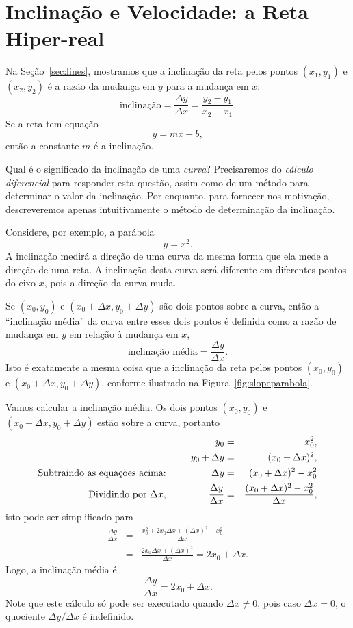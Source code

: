 \section{Inclinação e Velocidade: a Reta Hiper-real}
\label{sec:hyperrealline}

Na Seção~\ref{sec:lines}, mostramos que a inclinação da reta pelos pontos
$(x_1, y_1)$ e $(x_2, y_2)$ é a razão da mudança em $y$ para a
mudança em $x$:
\[
  \text{inclinação} = \frac{\Delta y}{\Delta x} = \frac{y_2 - y_1}{x_2 - x_1}.
\]
Se a reta tem equação
\[
  y = mx+b,
\]
então a constante $m$ é a inclinação.

Qual é o significado da inclinação de uma \emph{curva}? Precisaremos
do \emph{cálculo diferencial} para responder esta questão, assim como
de um método para determinar o valor da inclinação.
Por enquanto, para fornecer-nos motivação, descreveremos apenas
intuitivamente o método de determinação da inclinação.

Considere, por exemplo, a parábola
\[
  y = x^2.
\]
A inclinação medirá a direção de uma curva da mesma forma que ela
mede a direção de uma reta. A inclinação desta curva será diferente
em diferentes pontos do eixo $x$, pois a direção da curva muda.

Se $(x_0, y_0)$ e $(x_0 + \Delta x, y_0 + \Delta y)$ são dois pontos
sobre a curva, então a ``inclinação média'' da curva entre esses
dois pontos é definida como a razão de mudança em $y$ em relação
à mudança em $x$,
\[
  \text{inclinação média} = \frac{\Delta y}{\Delta x}.
\]
Isto é exatamente a mesma coisa que a inclinação da reta pelos pontos
$(x_0, y_0)$ e $(x_0 + \Delta x, y_0 + \Delta y)$, conforme
ilustrado na Figura~\ref{fig:slopeparabola}.


Vamos calcular a inclinação média. Os dois pontos $(x_0, y_0)$ e
$(x_0 + \Delta x, y_0 + \Delta y)$ estão sobre a curva, portanto
\begin{eqnarray*}
                         y_0 & = & x_0^2, \\
              y_0 + \Delta y & = & (x_0 + \Delta x)^2, \\
\text{Subtraindo as equações acima: } \hspace{10ex}
                    \Delta y & = & (x_0 + \Delta x)^2 - x_0^2 \\
\text{Dividindo por } \Delta x, \hspace{10ex}
   \frac{\Delta y}{\Delta x} & = & \frac{(x_0 + \Delta x)^2 - x_0^2}%
                                        {\Delta x},
\end{eqnarray*}
isto pode ser simplificado para
\begin{eqnarray*}
  \frac{\Delta y}{\Delta x}  & = & 
             \frac{x_0^2 + 2 x_0 \Delta x + (\Delta x)^2 - x_0^2}%
                  {\Delta x} \\
                             & = &
             \frac{2 x_0 \Delta x + (\Delta x)^2}%
                  {\Delta x} = 2x_0 + \Delta x.
\end{eqnarray*}
Logo, a inclinação média é
\[
  \frac{\Delta y}{\Delta x} = 2x_0 + \Delta x.
\]
Note que este cálculo só pode ser executado quando $\Delta x \ne 0$, pois
caso $\Delta x = 0$, o quociente $\Delta y / \Delta x$ é indefinido.

